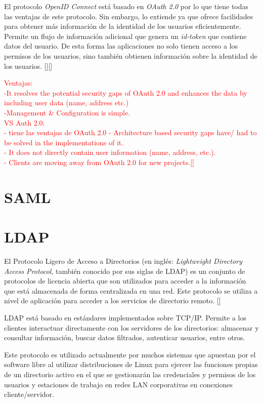 El protocolo \textit{OpenID Connect} está basado en \textit{OAuth 2.0} por lo que tiene todas las ventajas de este protocolo. Sin embargo, lo extiende ya que ofrece facilidades para obtener más información de la identidad de los usuarios eficientemente. Permite un flujo de información adicional que genera un \textit{id-token} que contiene datos del usuario. De esta forma las aplicaciones no solo tienen acceso a los permisos de los usuarios, sino también obtienen información sobre la identidad de los usuarios.  [\cite{openid-doc}][\cite{kutera2016single}]


\textcolor{red}{
	Ventajas:\\
	-It resolves the potential security gaps of OAuth 2.0 and enhances the data by including user data (name, address etc.) \\
	-Management \& Configuration is simple.	\\
	VS Auth 2.0: \\
	- tiene las ventajas de OAuth 2.0
	- Architecture based security gaps have/ had to be solved in the implementations of it.\\
	- It does not directly contain user information (name, address, etc.).\\
	- Clients are moving away from OAuth 2.0 for new projects.[\cite{kutera2016single}]}

\section{SAML}

\section{LDAP}
El Protocolo Ligero de Acceso a Directorios (en inglés: \textit{Lightweight Directory Access Protocol}, también conocido por sus siglas de LDAP) es un conjunto de protocolos de licencia abierta que son utilizados para acceder a la información que está almacenada de forma centralizada en una red. Este protocolo se utiliza a nivel de aplicación para acceder a los servicios de directorio remoto. [\cite{ldap-doc}]

LDAP está basado en estándares implementados sobre TCP/IP. Permite a los clientes interactuar directamente con los servidores de los directorios: almacenar y consultar información, buscar datos filtrados, autenticar usuarios, entre otros.

Este protocolo es utilizado actualmente por muchos sistemas que apuestan por el software libre al utilizar distribuciones de Linux para ejercer las funciones propias de un directorio activo en el que se gestionarán las credenciales y permisos de los usuarios y estaciones de trabajo en redes LAN corporativas en conexiones cliente/servidor.


